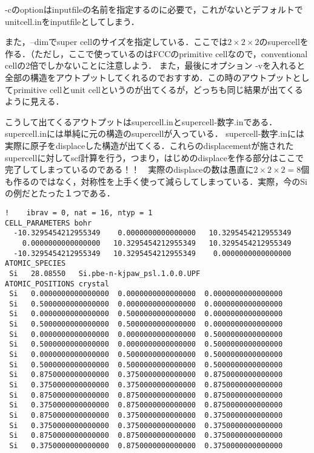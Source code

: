 \documentclass[a4j]{jarticle}
\begin{document}
-cのoptionはinputfileの名前を指定するのに必要で，これがないとデフォルトでunitcell.inをinputfileとしてしまう．


また，--dimでsuper cellのサイズを指定している．ここでは$2\times 2\times 2$のsupercellを作る．（ただし，ここで使っているのはFCCのprimitive cellなので，conventional cellの2倍でしかないことに注意しよう．
また，最後にオプション -vを入れると全部の構造をアウトプットしてくれるのでおすすめ．この時のアウトプットとしてprimitive cellとunit cellというのが出てくるが，どっちも同じ結果が出てくるように見える．

こうして出てくるアウトプットはsupercell.inとsupercell-数字.inである．supercell.inには単純に元の構造のsupercellが入っている．
supercell-数字.inには実際に原子をdisplaceした構造が出てくる．これらのdisplacementが施されたsupercellに対してscf計算を行う，つまり，はじめのdisplaceを作る部分はここで完了してしまっているのである！！　実際のdisplaceの数は愚直に$2\times 2\times 2=8$個も作るのではなく，対称性を上手く使って減らしてしまっている．実際，今のSiの例だとたった１つである．
\begin{lstlisting}
!    ibrav = 0, nat = 16, ntyp = 1
CELL_PARAMETERS bohr
  -10.3295454212955349    0.0000000000000000   10.3295454212955349
    0.0000000000000000   10.3295454212955349   10.3295454212955349
  -10.3295454212955349   10.3295454212955349    0.0000000000000000
ATOMIC_SPECIES
 Si   28.08550   Si.pbe-n-kjpaw_psl.1.0.0.UPF
ATOMIC_POSITIONS crystal
 Si   0.0000000000000000  0.0000000000000000  0.0000000000000000
 Si   0.5000000000000000  0.0000000000000000  0.0000000000000000
 Si   0.0000000000000000  0.5000000000000000  0.0000000000000000
 Si   0.5000000000000000  0.5000000000000000  0.0000000000000000
 Si   0.0000000000000000  0.0000000000000000  0.5000000000000000
 Si   0.5000000000000000  0.0000000000000000  0.5000000000000000
 Si   0.0000000000000000  0.5000000000000000  0.5000000000000000
 Si   0.5000000000000000  0.5000000000000000  0.5000000000000000
 Si   0.8750000000000000  0.3750000000000000  0.8750000000000000
 Si   0.3750000000000000  0.3750000000000000  0.8750000000000000
 Si   0.8750000000000000  0.8750000000000000  0.8750000000000000
 Si   0.3750000000000000  0.8750000000000000  0.8750000000000000
 Si   0.8750000000000000  0.3750000000000000  0.3750000000000000
 Si   0.3750000000000000  0.3750000000000000  0.3750000000000000
 Si   0.8750000000000000  0.8750000000000000  0.3750000000000000
 Si   0.3750000000000000  0.8750000000000000  0.3750000000000000 
\end{lstlisting}
\end{document}
